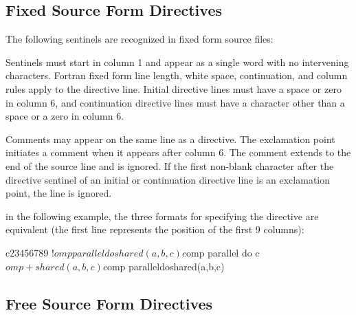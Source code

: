 \vspace{2\baselineskip}
\begin{fortranspecific}
\vspace{-1\baselineskip}
\subsection{Fixed Source Form Directives}
\label{subsec:Fixed Source Form Directives}
The following sentinels are recognized in fixed form source files:


Sentinels must start in column 1 and appear as a single word with no intervening
characters. Fortran fixed form line length, white space, continuation, and column rules
apply to the directive line. Initial directive lines must have a space or zero in column 6,
and continuation directive lines must have a character other than a space or a zero in
column 6.

Comments may appear on the same line as a directive. The exclamation point initiates a
comment when it appears after column 6. The comment extends to the end of the source
line and is ignored. If the first non-blank character after the directive sentinel of an
initial or continuation directive line is an exclamation point, the line is ignored.

\begin{note}
in the following example, the three formats for specifying the directive are
equivalent (the first line represents the position of the first 9 columns):

\begin{ompfPragma}
c23456789
!$omp parallel do shared(a,b,c)

c$omp parallel do
c$omp+shared(a,b,c)

c$omp paralleldoshared(a,b,c)
\end{ompfPragma}
\end{note}










\subsection{Free Source Form Directives}
\label{subsec:Free Source Form Directives}


\end{fortranspecific}
